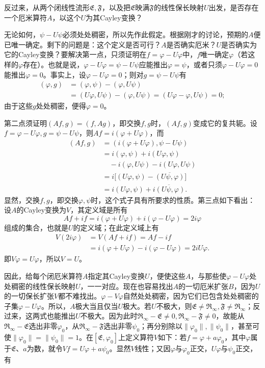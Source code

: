 \documentclass[fontsize=13pt,twoside,openany,headings=normal,parskip=false,bookmarkpackage=false,DIV=calc]{scrbook}
\begin{document}
反过来，从两个闭线性流形$\mathfrak E,\allowbreak \mathfrak F$，以及把$\mathfrak E$映满$\mathfrak F$的线性保长映射$U$出发，是否存在一个厄米算符$A$，以这个$U$为其Cayley变换？

\hypertarget{origpage-86}{}\label{origpage-86}无论如何，$\psi-U\psi$必须处处稠密，所以先作此假定。根据刚才的讨论，预期的$A$便已唯一确定。剩下的问题是：这个定义是否可行？$A$是否确实厄米？$U$是否确实为它的Cayley变换？要解决第一点，只须证明在$f=\varphi-U\varphi$中，$f$唯一确定$\varphi$（若这样的$\varphi$存在）。也就是说，$\varphi-U\varphi=\psi-U\psi$应能推出$\varphi=\psi$，或者只须$\varphi-U\varphi=0$能推出$\varphi=0$。事实上，设$\varphi-U\varphi=0$；则对$g=\psi-U\psi$有
\begin{align*}
(\varphi,g)&=(\varphi,\psi)-(\varphi,U\psi)\\
&=(U\varphi,U\psi)-(\varphi,U\psi)
=(U\varphi-\varphi,U\psi)=0;
\end{align*}
由于这些$g$处处稠密，便得$\varphi=0$。

第二点须证明$(Af,\allowbreak g)=(f,\allowbreak Ag)$，即交换$f,\allowbreak g$时，$(Af,\allowbreak g)$变成它的复共轭。设$f=\varphi-U\varphi,\allowbreak g=\psi-U\psi$，则$Af=i(\varphi+U\varphi)$，而
\begin{align*}
(Af,g)&=(i(\varphi+U\varphi),\psi-U\psi)\\
&=i(\varphi,\psi)+i(U\varphi,\psi)\\
&\quad-i(\varphi,U\psi)-i(U\varphi,U\psi)\\
&=i\big[(U\varphi,\psi)-\overline{(U\psi,\varphi)}\big]\\
&=i(U\varphi,\psi)+\overline{i(U\psi,\varphi)}.
\end{align*}
显然，交换$f,\allowbreak g$，即交换$\varphi,\allowbreak \psi$时，这个式子具有所要求的性质。第三点如下看出：设$A$的Cayley变换为$V$，其定义域是所有
\[
Af+if=i(\varphi+U\varphi)+i(\varphi-U\varphi)=2i\varphi
\]
组成的集合，也就是$U$的定义域；在此定义域上有
\begin{align*}
V(2i\varphi)&=V(Af+if)=Af-if\\
&=i(\varphi+U\varphi)-i(\varphi-U\varphi)=2iU\varphi.
\end{align*}
即$V\varphi=U\varphi$，所以$V=U$。

因此，给每个闭厄米算符$A$指定其Cayley变换$U$，便使这些$A$，与那些使$\varphi-U\varphi$处处稠密的线性保长映射$U$，一一对应。现在也容易找出$A$的一切厄米扩张$B$，因为$U$的一切保长扩张$V$都不难找出。$\varphi-V\varphi$自然处处稠密，因为它们已包含处处稠密的子集$\varphi-U\varphi$。所以，$A$极大当且仅当$U$极大。若$U$不极大，则$\mathfrak E\ne\mathfrak R_\infty,\allowbreak \mathfrak F\ne\mathfrak R_\infty$；反过来，这两式也能推出$U$不极大。因为此时$\mathfrak R_\infty-\mathfrak E\ne0,\allowbreak \mathfrak R_\infty-\mathfrak F\ne0$，故能从$\mathfrak R_\infty-\mathfrak E$选出非零$\varphi_0$，从$\mathfrak R_\infty-\mathfrak F$选出非零$\psi_0$；再分别除以$\|\varphi_0\|,\allowbreak \|\psi_0\|$，甚至可使$\|\varphi_0\|=\|\psi_0\|=1$。在$[\mathfrak E,\allowbreak \varphi_0]$上定义算符$V$如下：若$f=\varphi+a\varphi_0$，其中$\varphi$属于$\mathfrak E$、$a$为数，就令$Vf=U\varphi+a\psi_0$。显然$V$线性；又因$\varphi$与$\varphi_0$正交，$U\varphi$与$\psi_0$正交，有
\end{document}
